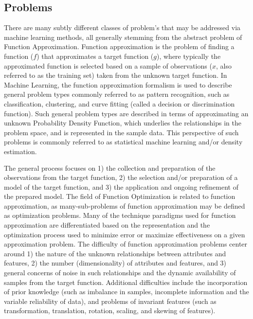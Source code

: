 \documentclass[a4paper, 11pt]{article}
\begin{document}
\subsection{Problems}
\label{subsec:problems}
There are many subtly different classes of problem's that may be addressed via machine learning methods, all generally stemming from the abstract problem of Function Approximation. Function approximation is the problem of finding a function ($f$) that approximates a target function ($g$), where typically the approximated function is selected based on a sample of observations ($x$, also referred to as the training set) taken from the unknown target function.
In Machine Learning, the function approximation formalism is used to describe general problem types commonly referred to as pattern recognition, such as classification, clustering, and curve fitting (called a decision or discrimination function). Such general problem types are described in terms of approximating an unknown Probability Density Function, which underlies the relationships in the problem space, and is represented in the sample data. This perspective of such problems is commonly referred to as statistical machine learning and/or density estimation.

The general process focuses on 1) the collection and preparation of the observations from the target function, 2) the selection and/or preparation of a model of the target function, and 3) the application and ongoing refinement of the prepared model. 
The field of Function Optimization is related to function approximation, as many-sub-problems of function approximation may be defined as optimization problems. Many of the technique paradigms used for function approximation are differentiated based on the representation and the optimization process used to minimize error or maximize effectiveness on a given approximation problem. 
The difficulty of function approximation problems center around 1) the nature of the unknown relationships between attributes and features, 2) the number (dimensionality) of attributes and features, and 3) general concerns of noise in such relationships and the dynamic availability of samples from the target function.
Additional difficulties include the incorporation of prior knowledge (such as imbalance in samples, incomplete information and the variable reliability of data), and problems of invariant features (such as transformation, translation, rotation, scaling, and skewing of features).
\end{document}
